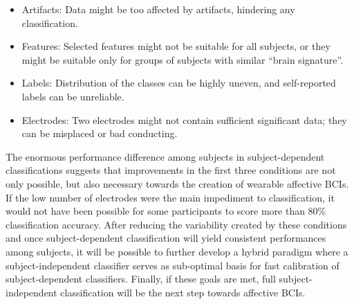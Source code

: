 \begin{itemize}
\item 	Artifacts: Data might be too affected by artifacts, hindering any classification.
\item 	Features: Selected features might not be suitable for all subjects, or they might be suitable only for groups of subjects with similar “brain signature”.
\item 	Labels: Distribution of the classes can be highly uneven, and self-reported labels can be unreliable.
\item 	Electrodes: Two electrodes might not contain sufficient significant data; they can be misplaced or bad conducting.
\end{itemize}
The enormous performance difference among subjects in subject-dependent classifications suggests that improvements in the first three conditions are not only possible, but also necessary towards the creation of wearable affective \ac{BCI}s. If the low number of electrodes were the main impediment to classification, it would not have been possible for some participants to score more than 80\% classification accuracy. After reducing the variability created by these conditions and once subject-dependent classification will yield consistent performances among subjects, it will be possible to further develop a hybrid paradigm where a subject-independent classifier serves as sub-optimal basis for fast calibration of subject-dependent classifiers. Finally, if these goals are met, full subject-independent classification will be the next step towards affective \ac{BCI}s.

